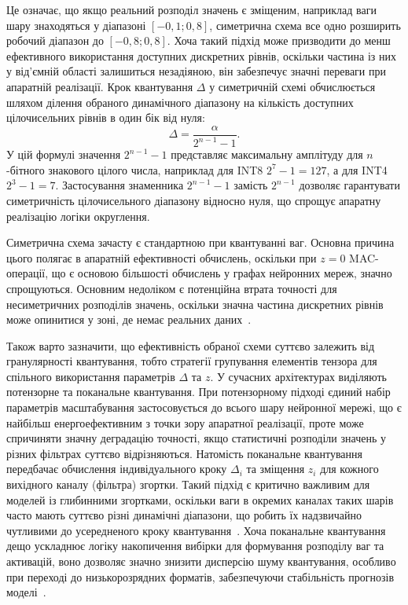 \documentclass{pma-mthesis}
\begin{document}
Це означає, що якщо реальний розподіл значень є зміщеним, наприклад ваги шару знаходяться у діапазоні $[-0,1; 0,8]$, симетрична схема все одно розширить робочий діапазон до $[-0,8; 0,8]$. Хоча такий підхід може призводити до менш ефективного використання доступних дискретних рівнів, оскільки частина із них у від’ємній області залишиться незадіяною, він забезпечує значні переваги при апаратній реалізації. Крок квантування $\Delta$ у симетричній схемі обчислюється шляхом ділення обраного динамічного діапазону на кількість доступних цілочисельних рівнів в один бік від нуля:
\begin{equation}
    \Delta = \frac{\alpha}{2^{n-1} - 1}.
\end{equation}
У цій формулі значення $2^{n-1} - 1$ представляє максимальну амплітуду для $n$-бітного знакового цілого числа, наприклад для INT8 $2^7 - 1 = 127$, а для INT4 $2^3 - 1 = 7$. Застосування знаменника $2^{n-1} - 1$ замість $2^{n-1}$ дозволяє гарантувати симетричність цілочисельного діапазону відносно нуля, що спрощує апаратну реалізацію логіки округлення.

Симетрична схема зачасту є стандартною при квантуванні ваг. Основна причина цього полягає в апаратній ефективності обчислень, оскільки при $z = 0$ MAC-операції, що є основою більшості обчислень у графах нейронних мереж, значно спрощуються. Основним недоліком є потенційна втрата точності для несиметричних розподілів значень, оскільки значна частина дискретних рівнів може опинитися у зоні, де немає реальних даних~\cite{jacob2018quantization}.

Також варто зазначити, що ефективність обраної схеми суттєво залежить від гранулярності квантування, тобто стратегії групування елементів тензора для спільного використання параметрів $\Delta$ та $z$. У сучасних архітектурах виділяють потензорне та поканальне квантування. При потензорному підході єдиний набір параметрів масштабування застосовується до всього шару нейронної мережі, що є найбільш енергоефективним з точки зору апаратної реалізації, проте може спричиняти значну деградацію точності, якщо статистичні розподіли значень у різних фільтрах суттєво відрізняються. Натомість поканальне квантування передбачає обчислення індивідуального кроку $\Delta_i$ та зміщення $z_i$ для кожного вихідного каналу (фільтра) згортки. Такий підхід є критично важливим для моделей із глибинними згортками, оскільки ваги в окремих каналах таких шарів часто мають суттєво різні динамічні діапазони, що робить їх надзвичайно чутливими до усередненого кроку квантування~\cite{gholami2022survey}. Хоча поканальне квантування дещо ускладнює логіку накопичення вибірки для формування розподілу ваг та активацій, воно дозволяє значно знизити дисперсію шуму квантування, особливо при переході до низькорозрядних форматів, забезпечуючи стабільність прогнозів моделі~\cite{krishnamoorthi2018quantizing,nagel2021white}.
\end{document}
